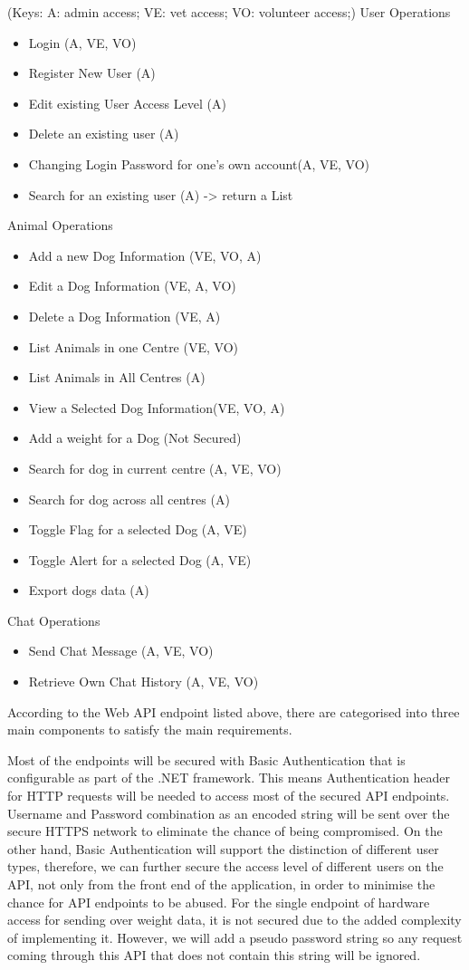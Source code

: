 (Keys: A: admin access; VE: vet access; VO: volunteer access;)
User Operations
\begin{itemize}
  \item Login (A, VE, VO)
  \item Register New User (A)
  \item Edit existing User Access Level (A)
  \item Delete an existing user (A)
  \item Changing Login Password for one's own account(A, VE, VO)
  \item Search for an existing user (A) -> return a List
 \end{itemize}
 Animal Operations
 \begin{itemize}
  \item Add a new Dog Information (VE, VO, A)
  \item Edit a Dog Information (VE, A, VO)
  \item Delete a Dog Information (VE, A)
  \item List Animals in one Centre (VE, VO)
  \item List Animals in All Centres (A)
  \item View a Selected Dog Information(VE, VO, A)
  \item Add a weight for a Dog (Not Secured)
  \item Search for dog in current centre (A, VE, VO)
  \item Search for dog across all centres (A) 
  \item Toggle Flag for a selected Dog (A, VE)
  \item Toggle Alert for a selected Dog (A, VE)
  \item Export dogs data (A)
 \end{itemize}
 Chat Operations
 \begin{itemize}
  \item Send Chat Message (A, VE, VO)
  \item Retrieve Own Chat History (A, VE, VO) 
 \end{itemize}

According to the Web API endpoint listed above, there are categorised into three main components to satisfy the main requirements.

Most of the endpoints will be secured with Basic Authentication that is configurable as part of the .NET framework. This means Authentication header for HTTP requests will be needed to access most of the secured API endpoints. Username and Password combination as an encoded string will be sent over the secure HTTPS network to eliminate the chance of being compromised. On the other hand, Basic Authentication will support the distinction of different user types, therefore, we can further secure the access level of different users on the API, not only from the front end of the application, in order to minimise the chance for API endpoints to be abused. For the single endpoint of hardware access for sending over weight data, it is not secured due to the added complexity of implementing it. However, we will add a pseudo password string so any request coming through this API that does not contain this string will be ignored.

